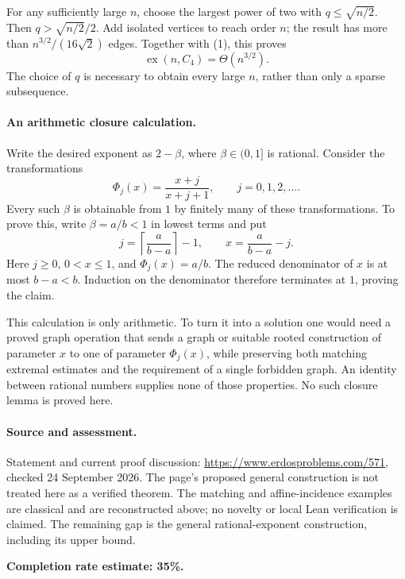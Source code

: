 For any sufficiently large \(n\), choose the largest power of two with \(q\leq\sqrt{n/2}\). Then \(q>\sqrt{n/2}/2\). Add isolated vertices to reach order \(n\); the result has more than \(n^{3/2}/(16\sqrt2)\) edges. Together with (1), this proves
\[
 \operatorname{ex}(n,C_4)=\Theta(n^{3/2}). \tag{2}
\]
The choice of \(q\) is necessary to obtain every large \(n\), rather than only a sparse subsequence.

\paragraph{An arithmetic closure calculation.}
Write the desired exponent as \(2-\beta\), where \(\beta\in(0,1]\) is rational. Consider the transformations
\[
 \Phi_j(x)=\frac{x+j}{x+j+1},\qquad j=0,1,2,\ldots.
\]
Every such \(\beta\) is obtainable from \(1\) by finitely many of these transformations. To prove this, write \(\beta=a/b<1\) in lowest terms and put
\[
 j=\left\lceil\frac a{b-a}\right\rceil-1,
 \qquad x=\frac a{b-a}-j.
\]
Here \(j\geq0\), \(0<x\leq1\), and \(\Phi_j(x)=a/b\). The reduced denominator of \(x\) is at most \(b-a<b\). Induction on the denominator therefore terminates at \(1\), proving the claim.

This calculation is only arithmetic. To turn it into a solution one would need a proved graph operation that sends a graph or suitable rooted construction of parameter \(x\) to one of parameter \(\Phi_j(x)\), while preserving both matching extremal estimates and the requirement of a single forbidden graph. An identity between rational numbers supplies none of those properties. No such closure lemma is proved here.

\paragraph{Source and assessment.}
Statement and current proof discussion: \url{https://www.erdosproblems.com/571}, checked 24 September 2026. The page's proposed general construction is not treated here as a verified theorem. The matching and affine-incidence examples are classical and are reconstructed above; no novelty or local Lean verification is claimed. The remaining gap is the general rational-exponent construction, including its upper bound.

\textbf{Completion rate estimate: 35\%.}
